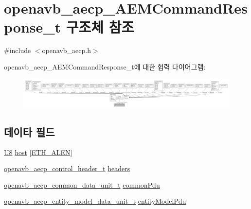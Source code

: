 \hypertarget{structopenavb__aecp___a_e_m_command_response__t}{}\section{openavb\+\_\+aecp\+\_\+\+A\+E\+M\+Command\+Response\+\_\+t 구조체 참조}
\label{structopenavb__aecp___a_e_m_command_response__t}


{\ttfamily \#include $<$openavb\+\_\+aecp.\+h$>$}



openavb\+\_\+aecp\+\_\+\+A\+E\+M\+Command\+Response\+\_\+t에 대한 협력 다이어그램\+:
\nopagebreak
\begin{figure}[H]
\begin{center}
\leavevmode
\includegraphics[width=350pt]{structopenavb__aecp___a_e_m_command_response__t__coll__graph}
\end{center}
\end{figure}
\subsection*{데이타 필드}
\begin{DoxyCompactItemize}
\item 
\hyperlink{openavb__types__base__pub_8h_aa63ef7b996d5487ce35a5a66601f3e73}{U8} \hyperlink{structopenavb__aecp___a_e_m_command_response__t_af49630bd03e5ae4979e6213e3793876e}{host} \mbox{[}\hyperlink{avb__avtp_8h_a9822d89774e0d6ddaa06503950130423}{E\+T\+H\+\_\+\+A\+L\+EN}\mbox{]}
\item 
\hyperlink{structopenavb__aecp__control__header__t}{openavb\+\_\+aecp\+\_\+control\+\_\+header\+\_\+t} \hyperlink{structopenavb__aecp___a_e_m_command_response__t_a16afa0982cfd4ce9cdd5bda28d6cebe2}{headers}
\item 
\hyperlink{structopenavb__aecp__common__data__unit__t}{openavb\+\_\+aecp\+\_\+common\+\_\+data\+\_\+unit\+\_\+t} \hyperlink{structopenavb__aecp___a_e_m_command_response__t_ad6f02622785f0b6f92ab4329f747e01e}{common\+Pdu}
\item 
\hyperlink{structopenavb__aecp__entity__model__data__unit__t}{openavb\+\_\+aecp\+\_\+entity\+\_\+model\+\_\+data\+\_\+unit\+\_\+t} \hyperlink{structopenavb__aecp___a_e_m_command_response__t_a837e0716e898f24be1096090abd03bd3}{entity\+Model\+Pdu}
\end{DoxyCompactItemize}


